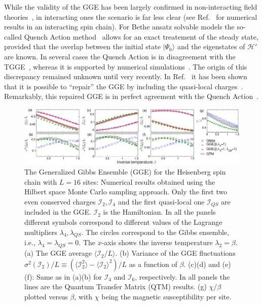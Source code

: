 \documentclass[twocolumn,superscriptaddress,prb,10pt]{revtex4-1}
\begin{document}
While the validity of the GGE has been largely confirmed in non-interacting field 
theories~\cite{calabrese-2011,calabrese-2012,fagotti-2013,kcc14,kcc14a}, in interacting ones the 
scenario is far less clear (see Ref.~ for numerical results in an 
interacting spin chain). For Bethe ansatz solvable models the so-called Quench Action 
method~\cite{caux-2013} allows for an exact treatement of the steady state, 
provided that the overlap between the initial state $|\Psi_0\rangle$ and the eigenstates 
of ${\mathcal H}'$ are known. In several cases the Quench Action is in disagreement with 
the TGGE~\cite{de-nardis-2014,pozsgay-2014,wouters-2014,mestyian-2015}, whereas it is 
supported by numerical simulations~\cite{pozsgay-2014}. 
The origin of this discrepancy remained unknown until very recently. In 
Ref.~ it has been shown that it is possible to 
``repair''  the GGE by including the quasi-local charges~\cite{prosen-2014,
pereira-2014,ilievski-2015}. Remarkably, this repaired GGE is in 
perfect agreement with the Quench Action~\cite{ilievski-2015a}. 

\begin{figure}[t]
\includegraphics*[width=0.93\linewidth]{./draft_figs/fig1}
\caption{The Generalized Gibbs Ensemble (GGE) for the Heisenberg spin chain with 
 $L=16$ sites: Numerical results obtained using the Hilbert space Monte 
 Carlo sampling approach. Only the first two even conserved charges ${\mathcal I}_2,{\mathcal I}_4$ 
 and the first quasi-local one ${\mathcal I}_{QS}$ are included in the GGE. 
 ${\mathcal I}_2$ is the Hamiltonian. In all 
 the panels different symbols correspond to different  values of the Lagrange multipliers 
 $\lambda_4,\lambda_{QS}$. The circles correspond to the Gibbs ensemble, i.e., 
 $\lambda_4=\lambda_{QS}=0$. The $x$-axis shows the inverse temperature  $\lambda_2=\beta$. 
 (a) The GGE average $\langle {\mathcal I}_2/L\rangle$. (b) Variance 
 of the GGE fluctuations $\sigma^2({\mathcal I}_2)/L\equiv(\langle {\mathcal I}_2^2
 \rangle-\langle {\mathcal I}_2\rangle^2)/L$ as a function of $\beta$. (c)(d) and (e)(f): 
 Same as in (a)(b) for ${\mathcal I}_4$ and ${\mathcal I}_6$, respectively. In all panels 
 the  lines  are the Quantum Transfer Matrix (QTM) results. 
 (g) $\chi/\beta$ plotted versus $\beta$, with 
 $\chi$ being the magnetic susceptibility per site. 
}
\label{fig1}
\end{figure}
\end{document}

